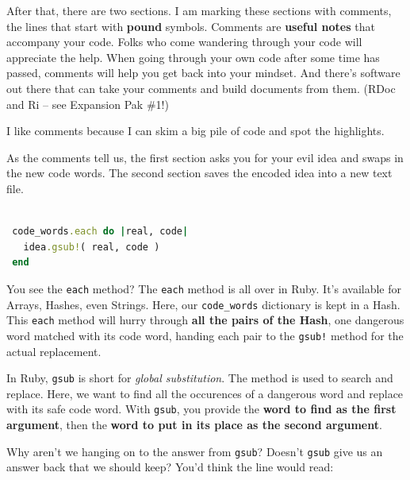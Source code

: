 \documentclass[10pt,twoside]{report}
\begin{document}
After that, there are two sections.  I am marking these sections with
comments, the lines that start with {\bf pound} symbols.  Comments are
{\bf useful notes} that accompany your code.  Folks who come wandering
through your code will appreciate the help.  When going through your
own code after some time has passed, comments will help you get back
into your mindset.  And there's software out there that can take your
comments and build documents from them.  (RDoc and Ri -- see Expansion
Pak \#1!)

I like comments because I can skim a big pile of code and spot the
highlights.

As the comments tell us, the first section asks you for your evil idea
and swaps in the new code words.  The second section saves the encoded
idea into a new text file.


\begin{lstlisting}[basicstyle=\ttfamily\color{basiccolor},
    commentstyle = \ttfamily\color{commentcolor},
    keywordstyle=\ttfamily\color{keywordscolor},
    stringstyle=\color{stringcolor},
    language=Ruby,
    basicstyle=\small\ttfamily,
    showstringspaces=false,
  ]

 code_words.each do |real, code|
   idea.gsub!( real, code )
 end

\end{lstlisting}

You see the \lstinline[breaklines=true]|each| method?  The
\lstinline[breaklines=true]|each| method is all over in Ruby.  It's
available for Arrays, Hashes, even Strings.  Here, our
\lstinline[breaklines=true]|code_words| dictionary is kept in a Hash.
This \lstinline[breaklines=true]|each| method will hurry through {\bf
  all the pairs of the Hash}, one dangerous word matched with its code
word, handing each pair to the \lstinline[breaklines=true]|gsub!|
method for the actual replacement.

In Ruby, \lstinline[breaklines=true]|gsub| is short for {\em global
  substitution}.  The method is used to search and replace. Here, we
want to find all the occurences of a dangerous word and replace with
its safe code word.  With \lstinline[breaklines=true]|gsub|, you
provide the {\bf word to find as the first argument}, then the {\bf
  word to put in its place as the second argument}.

Why aren't we hanging on to the answer from
\lstinline[breaklines=true]|gsub|?  Doesn't
\lstinline[breaklines=true]|gsub| give us an answer back that we
should keep?  You'd think the line would read:
\end{document}
